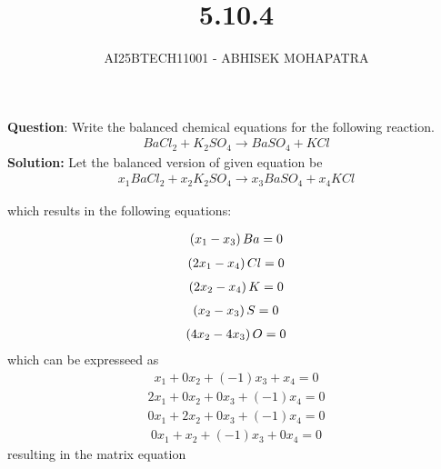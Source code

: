 \documentclass{beamer}
\title{5.10.4}
\author{AI25BTECH11001 - ABHISEK MOHAPATRA}
\numberwithin{equation}{section}
\begin{document}
{\let\newpage\relax\maketitle}
\renewcommand{\thefigure}{\theenumi}
\renewcommand{\thetable}{\theenumi}




	 	\textbf{Question}:
		Write the balanced chemical equations for the following reaction.
		\begin{align}
				BaCl_2+K_2SO_4 \rightarrow BaSO_4+KCl
		\end{align}
		\textbf{Solution:}
		Let the balanced version of given equation be
		\begin{align}
				x_1BaCl_2+x_2K_2SO_4 \rightarrow x_3BaSO_4+x_4KCl
		\end{align}

		which results in the following equations:


		\begin{align}
				\left(x_1-x_3\right)Ba = 0
		\end{align}
		\begin{align}
				\left(2x_1-x_4\right)Cl = 0
		\end{align}
		\begin{align}
				\left(2x_2-x_4\right)K = 0
		\end{align}
		\begin{align}
				\left(x_2-x_3\right)S = 0
		\end{align}
		\begin{align}
				\left(4x_2 - 4x_3\right)O = 0
		\end{align}
		which can be expresseed as
		\begin{align}
				x_1+ 0x_2 +(-1)x_3 +x_4= 0
		\end{align}
		\begin{align}
				2x_1+ 0x_2 +0x_3 +(-1)x_4= 0
		\end{align}
		\begin{align}
				0x_1+ 2x_2 +0x_3 +(-1)x_4= 0
		\end{align}
		\begin{align}
				0x_1+ x_2 +(-1)x_3 +0x_4= 0
		\end{align}
resulting in the matrix equation
\end{document}
